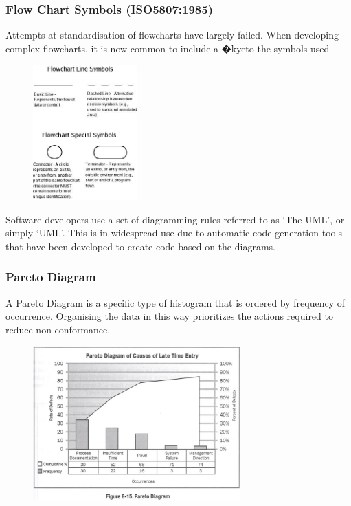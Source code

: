 \begin{frame}
\frametitle{Flow Chart Symbols  (ISO5807:1985) }
Attempts at standardisation of flowcharts have largely failed.
When developing complex flowcharts, it is now common to include a �kyeto the symbols used
\begin{figure}
	\centering
		\includegraphics[width = 4cm]{images/flow3.jpg}
	\label{fig:flow3}
\end{figure}
\end{frame}

Software developers use a set of diagramming rules referred to as `The UML', or simply `UML'.  This is in widespread use due to automatic code generation tools that have been developed to create code based on the diagrams.


\begin{frame}
\frametitle{Pareto Diagram}
A Pareto Diagram is a specific type of histogram that is ordered by frequency of occurrence.
Organising the data in this way prioritizes the actions required to reduce non-conformance.
\begin{figure}
	\centering
		\includegraphics[width = 8cm]{images/pareto.jpg}
	\label{fig:pareto}
\end{figure}

\end{frame}




